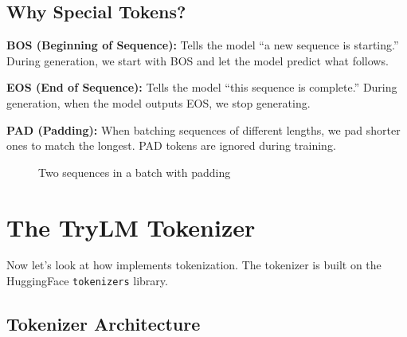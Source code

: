 \subsection{Why Special Tokens?}

\textbf{BOS (Beginning of Sequence):} Tells the model ``a new sequence is starting.'' During generation, we start with BOS and let the model predict what follows.

\textbf{EOS (End of Sequence):} Tells the model ``this sequence is complete.'' During generation, when the model outputs EOS, we stop generating.

\textbf{PAD (Padding):} When batching sequences of different lengths, we pad shorter ones to match the longest. PAD tokens are ignored during training.

\begin{figure}[H]
\centering
{}
\caption{Two sequences in a batch with padding}
\label{fig:special-tokens}
\end{figure}

\section{The TryLM Tokenizer}

Now let's look at how \TryLM implements tokenization. The tokenizer is built on the HuggingFace \texttt{tokenizers} library.

\subsection{Tokenizer Architecture}

